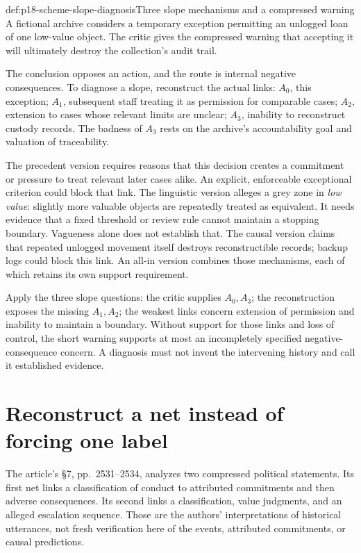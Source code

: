\begin{hbexample}{def:p18-scheme-slope-diagnosis}{Three slope mechanisms and a compressed warning}
A fictional archive considers a temporary exception permitting
an unlogged loan of one low-value object.
The critic gives the compressed warning that accepting it will
ultimately destroy the collection's audit trail.

The conclusion opposes an action, and the route is internal negative
consequences. To diagnose a slope, reconstruct the actual links:
\(A_0\), this exception; \(A_1\), subsequent staff treating it as
permission for comparable cases; \(A_2\), extension to cases whose
relevant limits are unclear; \(A_3\), inability to reconstruct
custody records. The badness of \(A_3\) rests on the archive's
accountability goal and valuation of traceability.

The precedent version requires reasons that this decision creates
a commitment or pressure to treat relevant later cases alike.
An explicit, enforceable exceptional criterion could block that link.
The linguistic version alleges a grey zone in \emph{low value}:
slightly more valuable objects are repeatedly treated as equivalent.
It needs evidence that a fixed threshold or review rule cannot
maintain a stopping boundary. Vagueness alone does not establish that.
The causal version claims that repeated unlogged movement itself
destroys reconstructible records; backup logs could block this link.
An all-in version combines those mechanisms, each of which retains
its own support requirement.

Apply the three slope questions: the critic supplies \(A_0,A_3\);
the reconstruction exposes the missing \(A_1,A_2\);
the weakest links concern extension of permission and inability
to maintain a boundary. Without support for those links and loss
of control, the short warning supports at most an incompletely
specified negative-consequence concern. A diagnosis must not
invent the intervening history and call it established evidence.
\end{hbexample}

\section{Reconstruct a net instead of forcing one label}
\label{sec:p18-scheme-nets}

The article's \S7, pp.~2531--2534, analyzes two compressed political
statements. Its first net links a classification of conduct to
attributed commitments and then adverse consequences. Its second
links a classification, value judgments, and an alleged escalation
sequence. Those are the authors' interpretations of historical
utterances, not fresh verification here of the events, attributed
commitments, or causal predictions.

